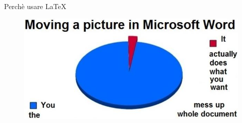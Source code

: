 \begin{frame}{Perchè usare \LaTeX}
	\begin{figure}[H]
		\centering
		\includegraphics[scale=0.5]{1-Introduzione/res/images/latexword}
	\end{figure}
\end{frame}